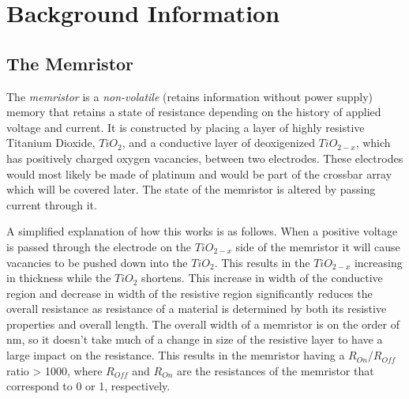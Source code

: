 \documentclass{sig-alternate}
\begin{document}
\section{Background Information}
\label{sec:body}


\subsection{The Memristor}
\label{sec:body}
The \textit{memristor} is a \textit{non-volatile} (retains information without power supply) memory that retains a state of resistance depending on the history of applied voltage and current.  It is constructed by placing a layer of highly resistive Titanium Dioxide, $TiO_2$, and a conductive layer of deoxigenized $TiO_{2-x}$, which has positively charged oxygen vacancies, between two electrodes.  These electrodes would most likely be made of platinum and would be part of the crossbar array which will be covered later.  The state of the memristor is altered by passing current through it.  

	A simplified explanation of how this works is as follows.  When a positive voltage is passed through the electrode on the $TiO_{2-x}$ side of the memristor it will cause vacancies to be pushed down into the $TiO_2$.  This results in the $TiO_{2-x}$ increasing in thickness while the $TiO_2$ shortens.  This increase in width of the conductive region and decrease in width of the resistive region significantly reduces the overall resistance as resistance of a material is determined by both its resistive properties and overall length.  The overall width of a memristor is on the order of nm, so it doesn't take much of a change in size of the resistive layer to have a large impact on the resistance.  This results in the memristor having a $R_{On}/R_{Off}$ ratio > 1000, where $R_{Off}$ and $R_{On}$ are the resistances of the memristor that correspond to 0 or 1, respectively.
\end{document}
